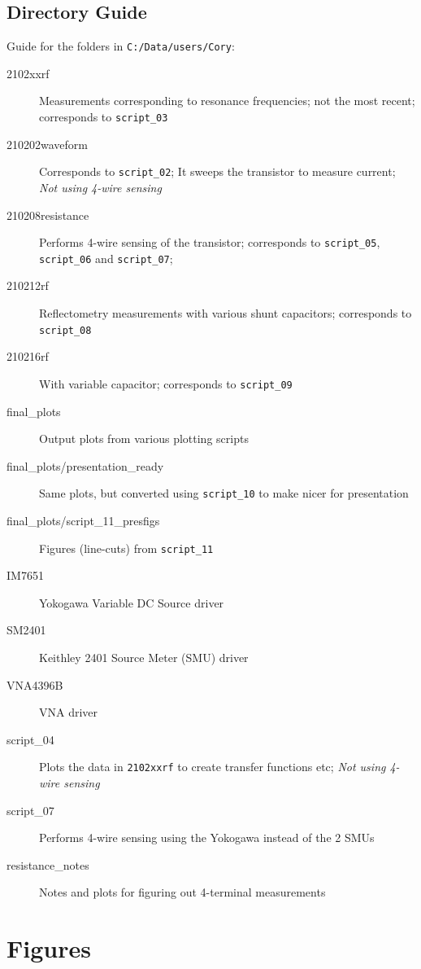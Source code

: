 \documentclass{article}
\begin{document}
\begin{multicols*}{2}
    \subsection{Directory Guide}

    Guide for the folders in \verb`C:/Data/users/Cory`:

    \begin{description}
        \item[2102xxrf] Measurements corresponding to resonance frequencies; not the most recent; corresponds to \verb`script_03`
        \item[210202waveform] Corresponds to \verb`script_02`; It sweeps the transistor to measure current; \emph{Not using 4-wire sensing}
        \item[210208resistance] Performs 4-wire sensing of the transistor; corresponds to \verb`script_05`, \verb`script_06` and \verb`script_07`;
        \item[210212rf] Reflectometry measurements with various shunt capacitors; corresponds to \verb`script_08`
        \item[210216rf] With variable capacitor; corresponds to \verb`script_09`
        \item[final\_plots] Output plots from various plotting scripts
        \item[final\_plots/presentation\_ready] Same plots, but converted using \verb`script_10` to make nicer for presentation
        \item[final\_plots/script\_11\_presfigs] Figures (line-cuts) from \verb`script_11`
        \item[IM7651] Yokogawa Variable DC Source driver
        \item[SM2401] Keithley 2401 Source Meter (SMU) driver
        \item[VNA4396B] VNA driver
        \item[script\_04] Plots the data in \verb`2102xxrf` to create transfer functions etc; \emph{Not using 4-wire sensing}
        \item[script\_07] Performs 4-wire sensing using the Yokogawa instead of the 2 SMUs
        \item[resistance\_notes] Notes and plots for figuring out 4-terminal measurements

    \end{description}

\end{multicols*}

\section{Figures}
\end{document}
